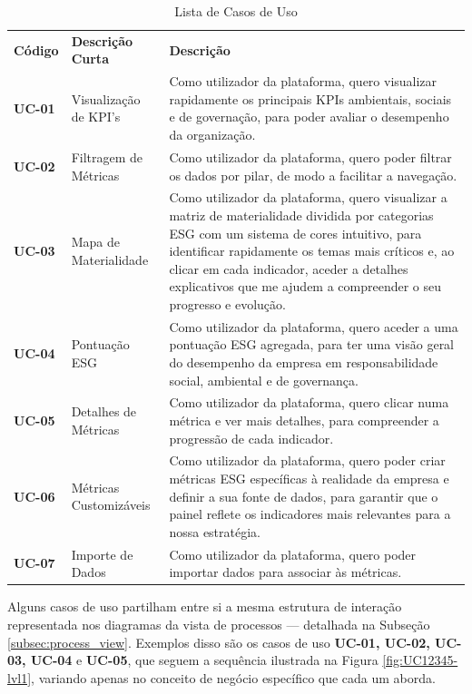\begin{table}[H]
    \renewcommand{\arraystretch}{1.2}
    \setlength{\tabcolsep}{10pt}
    \centering
    \begin{tabular}{>{\bfseries}p{3.5cm} p{4cm} p{7cm}}
        \rowcolor{orange!50}
        Código & \textbf{Descrição Curta} & \textbf{Descrição} \\
        UC-01 & Visualização de KPI's & Como utilizador da plataforma, quero visualizar rapidamente os principais KPIs ambientais, sociais e de governação, para poder avaliar o desempenho da organização. \\
        UC-02 & Filtragem de Métricas & Como utilizador da plataforma, quero poder filtrar os dados por pilar, de modo a facilitar a navegação. \\
        UC-03 & Mapa de Materialidade & Como utilizador da plataforma, quero visualizar a matriz de materialidade dividida por categorias ESG com um sistema de cores intuitivo, para identificar rapidamente os temas mais críticos e, ao clicar em cada indicador, aceder a detalhes explicativos que me ajudem a compreender o seu progresso e evolução. \\
        UC-04 & Pontuação ESG & Como utilizador da plataforma, quero aceder a uma pontuação ESG agregada, para ter uma visão geral do desempenho da empresa em responsabilidade social, ambiental e de governança. \\
        UC-05 & Detalhes de Métricas & Como utilizador da plataforma, quero clicar numa métrica e ver mais detalhes, para compreender a progressão de cada indicador. \\
        UC-06 & Métricas Customizáveis & Como utilizador da plataforma, quero poder criar métricas ESG específicas à realidade da empresa e definir a sua fonte de dados, para garantir que o painel reflete os indicadores mais relevantes para a nossa estratégia. \\
        UC-07 & Importe de Dados & Como utilizador da plataforma, quero poder importar dados para associar às métricas. \\      
    \end{tabular}
    \caption{Lista de Casos de Uso}
    \label{tab:use_cases}
\end{table}

Alguns casos de uso partilham entre si a mesma estrutura de interação representada nos diagramas da vista de processos — detalhada na Subseção \ref{subsec:process_view}. Exemplos disso são os casos de uso \textbf{UC-01, UC-02, UC-03, UC-04} e \textbf{UC-05}, que seguem a sequência ilustrada na Figura \ref{fig:UC12345-lvl1}, variando apenas no conceito de negócio específico que cada um aborda.

